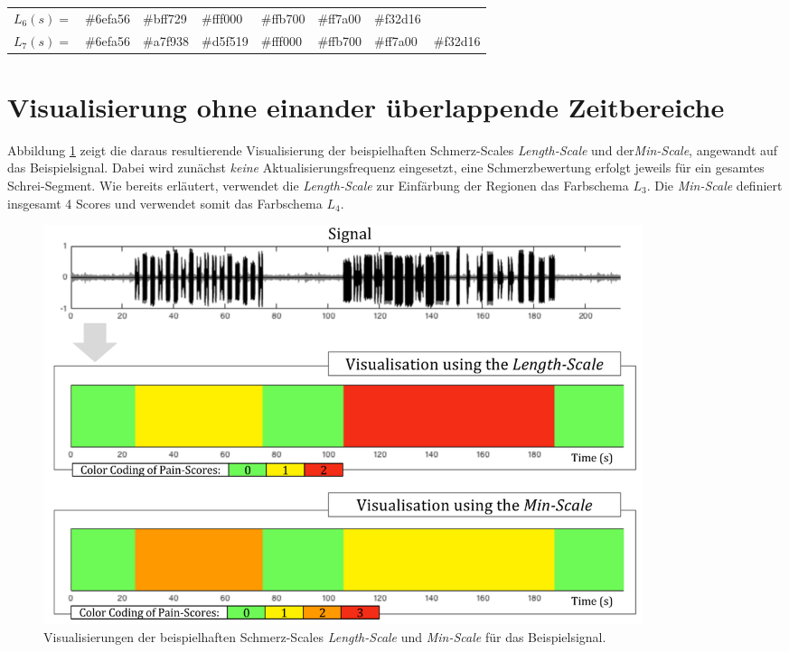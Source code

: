\begin{table}[h]
\begin{tabular}{@{}clllllll@{}}
\multicolumn{1}{l|}{$L_6(s) = $} & \multicolumn{1}{l|}{\cellcolor[HTML]{6EFA56}\#6efa56} & \multicolumn{1}{l|}{\cellcolor[HTML]{BFF729}\#bff729} & \multicolumn{1}{l|}{\cellcolor[HTML]{FFF000}\#fff000} & \multicolumn{1}{l|}{\cellcolor[HTML]{FFB700}\#ffb700} & \multicolumn{1}{l|}{\cellcolor[HTML]{FF7A00}\#ff7a00} & \multicolumn{1}{l|}{\cellcolor[HTML]{F32D16}\#f32d16} &                                                       \\ \cmidrule(l){2-8} 
\multicolumn{1}{l|}{$L_7(s) = $} & \multicolumn{1}{l|}{\cellcolor[HTML]{6EFA56}\#6efa56} & \multicolumn{1}{l|}{\cellcolor[HTML]{A7F938}\#a7f938} & \multicolumn{1}{l|}{\cellcolor[HTML]{D5F519}\#d5f519} & \multicolumn{1}{l|}{\cellcolor[HTML]{FFF000}\#fff000} & \multicolumn{1}{l|}{\cellcolor[HTML]{FFB700}\#ffb700} & \multicolumn{1}{l|}{\cellcolor[HTML]{FF7A00}\#ff7a00} & \multicolumn{1}{l|}{\cellcolor[HTML]{F32D16}\#f32d16} \\ \bottomrule
\end{tabular}
\end{table}

\section{Visualisierung ohne einander überlappende Zeitbereiche}
\label{sec:vizNoOverlap}

Abbildung \ref{fig:viz_without_t_01} zeigt die daraus resultierende Visualisierung der beispielhaften Schmerz-Scales \emph{Length-Scale} und der\emph{Min-Scale}, angewandt auf das Beispielsignal. Dabei wird zunächst \emph{keine} Aktualisierungsfrequenz eingesetzt, eine Schmerzbewertung erfolgt jeweils für ein gesamtes Schrei-Segment. Wie bereits erläutert, verwendet die \emph{Length-Scale} zur Einfärbung der Regionen das Farbschema $L_3$. Die \emph{Min-Scale} definiert insgesamt 4 Scores und verwendet somit das Farbschema $L_4$.

\begin{figure}[h]
	\centering
	\includegraphics[width=0.85\textwidth]{bilder/viz_without_t_06.png}
	\caption[Visualisierungen der beispielhaften Schmerz-Scales durch schematische Balken]{Visualisierungen der beispielhaften Schmerz-Scales \emph{Length-Scale} und \emph{Min-Scale} für das Beispielsignal.}
	\label{fig:viz_without_t_01}
\end{figure}

